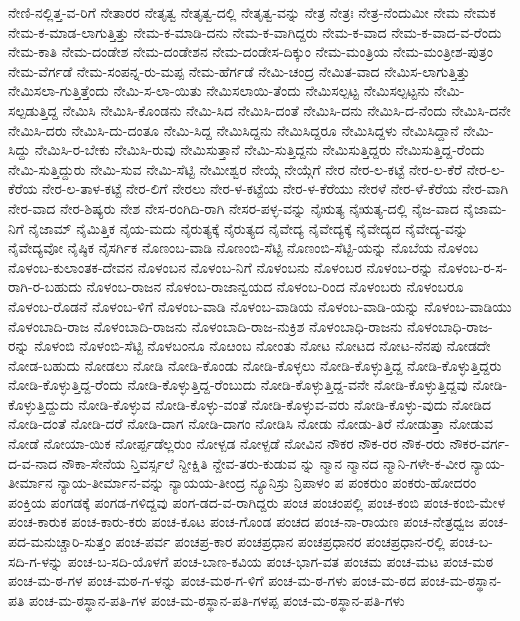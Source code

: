 ನೇಣಿ-ನಲ್ಲಿತ್ತ-ವ-ರಿಗೆ
ನೇತಾರರ
ನೇತೃತ್ವ
ನೇತೃತ್ವ-ದಲ್ಲಿ
ನೇತೃತ್ವ-ವನ್ನು
ನೇತ್ರ
ನೇತ್ರಃ
ನೇತ್ರ-ನೆಂದುಮೀ
ನೇಮ
ನೇಮಕ
ನೇಮ-ಕ-ಮಾಡ-ಲಾಗುತ್ತಿತ್ತು
ನೇಮ-ಕ-ಮಾಡಿ-ದನು
ನೇಮ-ಕ-ವಾಗಿದ್ದರು
ನೇಮ-ಕ-ವಾದ
ನೇಮ-ಕ-ವಾದ-ವ-ರೆಂದು
ನೇಮ-ಕಾತಿ
ನೇಮ-ದಂಡೇಶ
ನೇಮ-ದಂಡೇಶನ
ನೇಮ-ದಂಡೇಸ-ದಿಕ್ಕುಂ
ನೇಮ-ಮಂತ್ರಿಯ
ನೇಮ-ಮಂತ್ರೀಶ-ಪುತ್ರಂ
ನೇಮ-ವೆರ್ಗಡೆ
ನೇಮ-ಸಂಪನ್ನ-ರು-ಮಪ್ಪ
ನೇಮ-ಹೆರ್ಗಡೆ
ನೇಮಿ-ಚಂದ್ರ
ನೇಮಿತ-ವಾದ
ನೇಮಿಸ-ಲಾಗುತ್ತಿತ್ತು
ನೇಮಿಸಲಾ-ಗುತ್ತಿತ್ತೆಂದು
ನೇಮಿ-ಸ-ಲಾ-ಯಿತು
ನೇಮಿಸಲಾಯಿ-ತೆಂದು
ನೇಮಿಸಲ್ಪಟ್ಟ
ನೇಮಿಸಲ್ಪಟ್ಟನು
ನೇಮಿ-ಸಲ್ಪಡುತ್ತಿದ್ದ
ನೇಮಿಸಿ
ನೇಮಿಸಿ-ಕೊಂಡನು
ನೇಮಿ-ಸಿದ
ನೇಮಿಸಿ-ದಂತೆ
ನೇಮಿಸಿ-ದನು
ನೇಮಿಸಿ-ದ-ನೆಂದು
ನೇಮಿಸಿ-ದನೇ
ನೇಮಿಸಿ-ದರು
ನೇಮಿಸಿ-ದು-ದಂತೂ
ನೇಮಿ-ಸಿದ್ದ
ನೇಮಿಸಿದ್ದನು
ನೇಮಿಸಿದ್ದರೂ
ನೇಮಿಸಿದ್ದಳು
ನೇಮಿಸಿದ್ದಾನೆ
ನೇಮಿ-ಸಿದ್ದು
ನೇಮಿಸಿ-ರ-ಬೇಕು
ನೇಮಿಸಿ-ರುವು
ನೇಮಿಸುತ್ತಾನೆ
ನೇಮಿ-ಸುತ್ತಿದ್ದನು
ನೇಮಿಸುತ್ತಿದ್ದರು
ನೇಮಿಸುತ್ತಿದ್ದ-ರೆಂದು
ನೇಮಿ-ಸುತ್ತಿದ್ದುರು
ನೇಮಿ-ಸುವ
ನೇಮಿ-ಸೆಟ್ಟಿ
ನೇಮೀಶ್ವರ
ನೇಯ್ಗೆ
ನೇಯ್ಗೆಗೆ
ನೇರ
ನೇರ-ಲ-ಕಟ್ಟೆ
ನೇರ-ಲ-ಕೆರೆ
ನೇರ-ಲ-ಕೆರೆಯ
ನೇರ-ಲ-ತಾಳ-ಕಟ್ಟೆ
ನೇರ-ಲಿಗೆ
ನೇರಲು
ನೇರ-ಳ-ಕಟ್ಟೆಯ
ನೇರ-ಳ-ಕೆರೆಯು
ನೇರಳೆ
ನೇರ-ಳೆ-ಕೆರೆಯ
ನೇರ-ವಾಗಿ
ನೇರ-ವಾದ
ನೇರ-ಶಿಷ್ಯರು
ನೇಶ
ನೇಸ-ರಂಗಿದಿ-ರಾಗಿ
ನೇಸರ-ಪಳ್ಳ-ವನ್ನು
ನೈಋತ್ಯ
ನೈಋತ್ಯ-ದಲ್ಲಿ
ನೈಜ-ವಾದ
ನೈಜಾಮ-ನಿಗೆ
ನೈಜಾಮ್
ನೈಮಿತ್ತಿಕ
ನೈಯ-ಮದು
ನೈರುತ್ಯಕ್ಕೆ
ನೈರುತ್ಯದ
ನೈವೇದ್ಯ
ನೈವೇದ್ಯಕ್ಕೆ
ನೈವೇದ್ಯದ
ನೈವೇದ್ಯ-ವನ್ನು
ನೈವೇದ್ಯವೋ
ನೈಷ್ಠಿಕ
ನೈಸರ್ಗಿಕ
ನೊಣಂಬ-ವಾಡಿ
ನೊಣಂಬಿ-ಸೆಟ್ಟಿ
ನೊಣಂಬಿ-ಸೆಟ್ಟಿ-ಯನ್ನು
ನೊಬೆಯ
ನೊಳಂಬ
ನೊಳಂಬ-ಕುಲಾಂತಕ-ದೇವನ
ನೊಳಂಬನ
ನೊಳಂಬ-ನಿಗೆ
ನೊಳಂಬನು
ನೊಳಂಬರ
ನೊಳಂಬ-ರನ್ನು
ನೊಳಂಬ-ರ-ಸ-ರಾಗಿ-ರ-ಬಹುದು
ನೊಳಂಬ-ರಾಜನ
ನೊಳಂಬ-ರಾಜಾನ್ವಯದ
ನೊಳಂಬ-ರಿಂದ
ನೊಳಂಬರು
ನೊಳಂಬರೂ
ನೊಳಂಬ-ರೊಡನೆ
ನೊಳಂಬ-ಳಿಗೆ
ನೊಳಂಬ-ವಾಡಿ
ನೊಳಂಬ-ವಾಡಿಯ
ನೊಳಂಬ-ವಾಡಿ-ಯನ್ನು
ನೊಳಂಬ-ವಾಡಿಯು
ನೊಳಂಬಾದಿ-ರಾಜ
ನೊಳಂಬಾದಿ-ರಾಜನು
ನೊಳಂಬಾದಿ-ರಾಜ-ನುಕ್ರಿಶ
ನೊಳಂಬಾಧಿ-ರಾಜನು
ನೊಳಂಬಾಧಿ-ರಾಜ-ರನ್ನು
ನೊಳಂಬಿ
ನೊಳಂಬಿ-ಸೆಟ್ಟಿ
ನೊಳಬಂನೂ
ನೊೞಂಬ
ನೋಂತು
ನೋಟ
ನೋಟದ
ನೋಟ-ನೆನಪು
ನೋಡದೇ
ನೋಡ-ಬಹುದು
ನೋಡಲು
ನೋಡಿ
ನೋಡಿ-ಕೊಂಡು
ನೋಡಿ-ಕೊಳ್ಳಲು
ನೋಡಿ-ಕೊಳ್ಳುತ್ತಿದ್ದ
ನೋಡಿ-ಕೊಳ್ಳುತ್ತಿದ್ದರು
ನೋಡಿ-ಕೊಳ್ಳುತ್ತಿದ್ದ-ರೆಂದು
ನೋಡಿ-ಕೊಳ್ಳುತ್ತಿದ್ದ-ರೆಂಬುದು
ನೋಡಿ-ಕೊಳ್ಳುತ್ತಿದ್ದ-ವನೇ
ನೋಡಿ-ಕೊಳ್ಳುತ್ತಿದ್ದವು
ನೋಡಿ-ಕೊಳ್ಳುತ್ತಿದ್ದುದು
ನೋಡಿ-ಕೊಳ್ಳುವ
ನೋಡಿ-ಕೊಳ್ಳು-ವಂತೆ
ನೋಡಿ-ಕೊಳ್ಳುವ-ವರು
ನೋಡಿ-ಕೊಳ್ಳು-ವುದು
ನೋಡಿದ
ನೋಡಿ-ದಂತೆ
ನೋಡಿ-ದರೆ
ನೋಡಿ-ದಾಗ
ನೋಡಿ-ದಾಗಂ
ನೋಡಿಸಿ
ನೋಡು
ನೋಡು-ತಿರೆ
ನೋಡುತ್ತಾ
ನೋಡುವ
ನೋಡೆ
ನೋಯಾ-ಯಿಕ
ನೋರ್ಪ್ಪಡೆಲ್ಲರುಂ
ನೋಳ್ಪಡ
ನೋಳ್ಪಡೆ
ನೋವಿನ
ನೌಕರ
ನೌಕ-ರರ
ನೌಕ-ರರು
ನೌಕರ-ವರ್ಗ-ದ-ವ-ನಾದ
ನೌಕಾ-ಸೇನೆಯ
ನ್ತಿವರ್ಸ್ಸಲೆ
ನ್ದೀಕ್ಷಿತಿ
ನ್ದೇವ-ತರು-ಕುಡುವ
ನ್ನು
ನ್ಮಾನ
ನ್ಮಾನದ
ನ್ಮಾನಿ-ಗಳೇ-ಕ-ವೀರ
ನ್ಯಾಯ-ತೀರ್ಮಾನ
ನ್ಯಾಯ-ತೀರ್ಮಾನ-ವನ್ನು
ನ್ಯಾಯಯ-ತೀಂದ್ರ
ನ್ಯೂನಿಸ್ರು
ನ್ರಿಪಾಳಂ
ಪ
ಪಂಕರುಂ
ಪಂಕರು-ಹೋದರಂ
ಪಂಕ್ತಿಯ
ಪಂಗಡಕ್ಕೆ
ಪಂಗಡ-ಗಳಿದ್ದವು
ಪಂಗ-ಡದ-ವ-ರಾಗಿದ್ದರು
ಪಂಚ
ಪಂಚಂಪಲ್ಲಿ
ಪಂಚ-ಕಂಬಿ
ಪಂಚ-ಕಂಬಿ-ಮೇಳ
ಪಂಚ-ಕಾರುಕ
ಪಂಚ-ಕಾರು-ಕರು
ಪಂಚ-ಕೂಟ
ಪಂಚ-ಗೊಂಡ
ಪಂಚದ
ಪಂಚ-ನಾ-ರಾಯಣ
ಪಂಚ-ನೇತ್ರಧ್ವಜ
ಪಂಚ-ಪದ-ಮನುಚ್ಚಾರಿ-ಸುತ್ತಂ
ಪಂಚ-ಪರ್ವ
ಪಂಚಪ್ರ-ಕಾರ
ಪಂಚಪ್ರಧಾನ
ಪಂಚಪ್ರಧಾನರ
ಪಂಚಪ್ರಧಾನ-ರಲ್ಲಿ
ಪಂಚ-ಬ-ಸದಿ-ಗ-ಳನ್ನು
ಪಂಚ-ಬ-ಸದಿ-ಯೊಳಗೆ
ಪಂಚ-ಬಾಣ-ಕವಿಯ
ಪಂಚ-ಭಾಗ-ವತ
ಪಂಚಮ
ಪಂಚ-ಮಟ
ಪಂಚ-ಮಠ
ಪಂಚ-ಮ-ಠ-ಗಳ
ಪಂಚ-ಮಠ-ಗ-ಳನ್ನು
ಪಂಚ-ಮಠ-ಗ-ಳಿಗೆ
ಪಂಚ-ಮ-ಠ-ಗಳು
ಪಂಚ-ಮ-ಠದ
ಪಂಚ-ಮ-ಠಸ್ಥಾನ-ಪತಿ
ಪಂಚ-ಮ-ಠಸ್ಥಾನ-ಪತಿ-ಗಳ
ಪಂಚ-ಮ-ಠಸ್ಥಾನ-ಪತಿ-ಗಳಪ್ಪ
ಪಂಚ-ಮ-ಠಸ್ಥಾನ-ಪತಿ-ಗಳು

